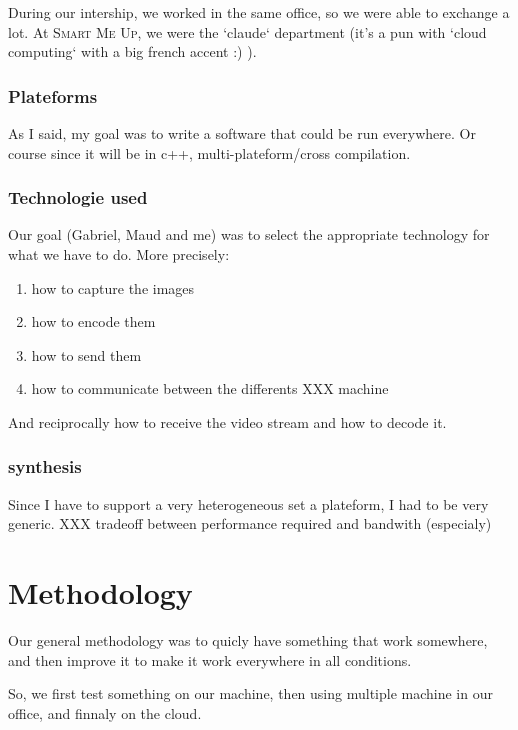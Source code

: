 \documentclass[a4paper,11pt]{custom}
\newcommand{\smu}{\textsc{Smart Me Up}}
\begin{document}
During our intership, we worked in the same office, so we were able to exchange
a lot. At \smu, we were the `claude` department (it's a pun with `cloud
computing` with a big french accent :) ).

\subsection{Plateforms}

As I said, my goal was to write a software that could be run everywhere. Or
course since it will be in c++, 
multi-plateform/cross compilation.

\subsection{Technologie used}

Our goal (Gabriel, Maud and me) was to select the appropriate technology for
what we have to do. More precisely:
\begin{enumerate}
\item how to capture the images
\item how to encode them
\item how to send them
\item how to communicate between the differents XXX machine
\end{enumerate}
And reciprocally how to receive the video stream and how to decode it.

\subsection{synthesis}

Since I have to support a very heterogeneous set a plateform, I had to be very
generic.
XXX tradeoff between performance required and bandwith (especialy)

\chapter{Methodology}

Our general methodology was to quicly have something that work somewhere, and
then improve it to make it work everywhere in all conditions.

So, we first test something on our machine, then using multiple machine in our
office, and finnaly on the cloud.
\end{document}
